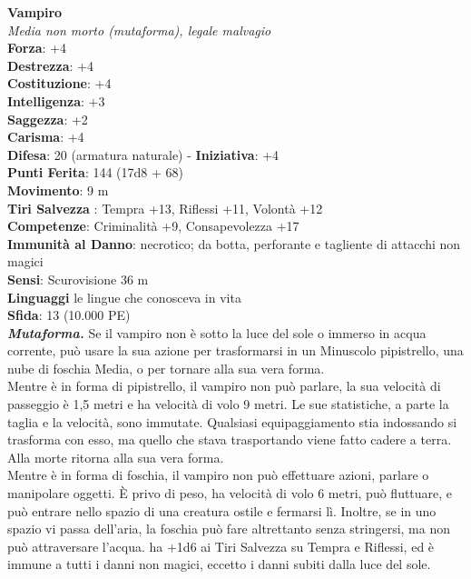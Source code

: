 \begin{multicols}{2}
\medskip\textbf{Vampiro}\\
\emph{Media non morto (mutaforma), legale malvagio}\\
\textbf{Forza}: +4\\
\textbf{Destrezza}: +4\\
\textbf{Costituzione}: +4\\
\textbf{Intelligenza}: +3\\
\textbf{Saggezza}: +2\\
\textbf{Carisma}: +4\\
\textbf{Difesa}: 20 (armatura naturale) - \textbf{Iniziativa}: +4\\
\textbf{Punti Ferita}: 144 (17d8 + 68)\\
\textbf{Movimento}: 9 m\\
\textbf{Tiri Salvezza} : Tempra +13, Riflessi +11, Volontà +12\\
\textbf{Competenze}: Criminalità +9, Consapevolezza +17\\
\textbf{Immunità al Danno}: necrotico; da botta, perforante e tagliente di attacchi non magici\\
\textbf{Sensi}: Scurovisione 36 m\\
\textbf{Linguaggi} le lingue che conosceva in vita\\
\textbf{Sfida}: 13 (10.000 PE)\smallskip\\

\emph{\textbf{Mutaforma.}} Se il vampiro non è sotto la luce del sole o immerso in acqua corrente, può usare la sua azione per trasformarsi in un Minuscolo pipistrello, una nube di foschia Media, o per tornare alla sua vera forma.\\
Mentre è in forma di pipistrello, il vampiro non può parlare, la sua velocità di passeggio è 1,5 metri e ha velocità di volo 9 metri. Le sue statistiche, a parte la taglia e la velocità, sono immutate. Qualsiasi equipaggiamento stia indossando si trasforma con esso, ma quello che stava trasportando viene fatto cadere a terra. Alla morte ritorna alla sua vera forma.\\

Mentre è in forma di foschia, il vampiro non può effettuare azioni, parlare o manipolare oggetti. È privo di peso, ha velocità di volo 6 metri, può fluttuare, e può entrare nello spazio di una creatura ostile e fermarsi lì. Inoltre, se in uno spazio vi passa dell'aria, la foschia può fare altrettanto senza stringersi, ma non può attraversare l'acqua. ha +1d6 ai Tiri Salvezza su Tempra e Riflessi, ed è immune a tutti i danni non magici, eccetto i danni subiti dalla luce del sole.\\


\end{multicols}
